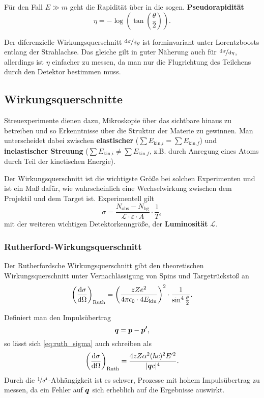 Für den Fall $E\gg m$ geht die Rapidität über in die sogen. \textbf{Pseudorapidität}
\begin{equation*}
	\eta = -\log\left(\tan\left(\frac{\theta}{2}\right)\right).
\end{equation*}

Der diferenzielle Wirkungsquerschnitt $\nicefrac{\text{d}\sigma}{\text{d}y}$ ist forminvariant unter Lorentzboosts entlang der Strahlachse.
Das gleiche gilt in guter Näherung auch für $\nicefrac{\text{d}\sigma}{\text{d}\eta}$, allerdings ist $\eta$ einfacher zu messen, da man nur die Flugrichtung des Teilchens durch den Detektor bestimmen muss.

\subsection{Wirkungsquerschnitte}
Streuexperimente dienen dazu, Mikroskopie über das sichtbare hinaus zu betreiben und so Erkenntnisse über die Struktur der Materie zu gewinnen.
Man unterscheidet dabei zwischen \textbf{elastischer} ($\sum E_{\text{kin,}i} = \sum E_{\text{kin,}f}$) und \textbf{inelastischer Streuung} ($\sum E_{\text{kin,}i} \neq \sum E_{\text{kin,}f}$, z.B. durch Anregung eines Atoms durch Teil der kinetischen Energie).

Der Wirkungsquerschnitt ist die wichtigste Größe bei solchen Experimenten und ist ein Maß dafür, wie wahrscheinlich eine Wechselwirkung zwischen dem Projektil und dem Target ist.
Experimentell gilt
\begin{equation*}
	\sigma = \frac{N_\text{obs}-N_\text{bg}}{\mathcal{L}\cdot\varepsilon\cdot A}\cdot\frac{1}{T},
\end{equation*}
mit der weiteren wichtigen Detektorkenngröße, der \textbf{Luminosität} $\mathcal{L}$.

\subsubsection{Rutherford-Wirkungsquerschnitt}
Der Rutherfordsche Wirkungsquerschnitt gibt den theoretischen Wirkungsquerschnitt unter Vernachlässigung von Spins und Targetrückstoß an
\begin{equation}\label{eq:ruth_sigma}
	\left(\diff[\sigma]{\Omega}\right)_\text{Ruth} = \left(\frac{zZe^2}{4\pi\epsilon_0\cdot 4E_\text{kin}}\right)^2\cdot\frac{1}{\sin^4\frac{\theta}{2}}.
\end{equation}

Definiert man den Impulsübertrag
\begin{equation*}
	\mvec{q} = \mvec{p}-\mvec{p'},
\end{equation*}
so lässt sich \autoref{eq:ruth_sigma} auch schreiben als
\begin{equation*}
	\left(\diff[\sigma]{\Omega}\right)_\text{Ruth} = \frac{4zZ\alpha^2(\hbar c)^2 E'^2}{|\mvec{q}c|^4}.
\end{equation*}
Durch die $\nicefrac{1}{q^4}$-Abhängigkeit ist es schwer, Prozesse mit hohem Impulsübertrag zu messen, da ein Fehler auf $\mvec{q}$ sich erheblich auf die Ergebnisse auswirkt.

